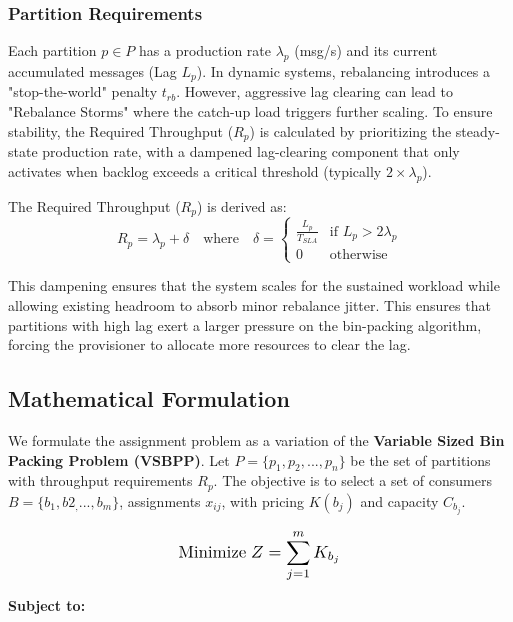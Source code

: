 ﻿\documentclass[conference]{IEEEtran}
\begin{document}
\subsubsection{Partition Requirements}

Each partition $p \in P$ has a production rate $\lambda_p$ (msg/s) and its current accumulated messages (Lag $L_p$). In dynamic systems, rebalancing introduces a "stop-the-world" penalty $t_{rb}$. However, aggressive lag clearing can lead to "Rebalance Storms" where the catch-up load triggers further scaling. To ensure stability, the Required Throughput ($R_p$) is calculated by prioritizing the steady-state production rate, with a dampened lag-clearing component that only activates when backlog exceeds a critical threshold (typically $2 \times \lambda_p$).

The Required Throughput ($R_p$) is derived as:
\begin{equation}
    R_p = \lambda_p + \delta \quad \text{where} \quad \delta = 
    \begin{cases} 
      \frac{L_p}{T_{SLA}} & \text{if } L_p > 2\lambda_p \\
      0 & \text{otherwise}
    \end{cases}
\end{equation}

This dampening ensures that the system scales for the sustained workload while allowing existing headroom to absorb minor rebalance jitter.
This ensures that partitions with high lag exert a larger pressure on the bin-packing algorithm, forcing the provisioner to allocate more resources to clear the lag.

\subsection{Mathematical Formulation}
We formulate the assignment problem as a variation of the \textbf{Variable Sized Bin Packing Problem (VSBPP)}. Let $P = \{p_1, p_2, ...,p_n\}$ be the set of partitions with throughput requirements $R_p$. The objective is to select a set of consumers $B = \{b_1, b2_,...,b_m\}$, assignments $x_{ij}$, with pricing $K(b_j)$ and capacity $C_{b_j}$.

\begin{equation}
\scalebox{1.2}{$ \displaystyle \text{Minimize} \; Z = \sum_{j=1}^{m} K_{b_j} $}
\end{equation}

\textbf{Subject to:}
\end{document}
